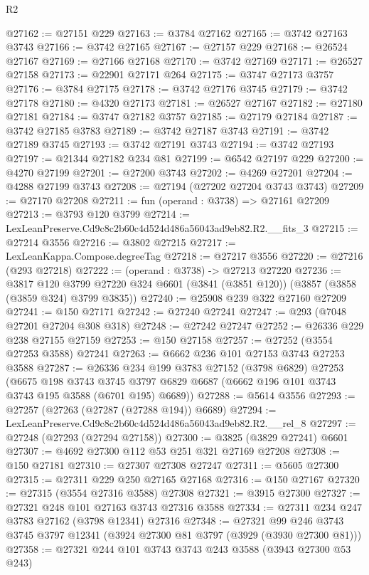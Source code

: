 \begin{lexlean}{R2}
\begin{coremodule}
@27162 := @27151 @229
@27163 := @3784 @27162
@27165 := @3742 @27163 @3743
@27166 := @3742 @27165
@27167 := @27157 @229
@27168 := @26524 @27167
@27169 := @27166 @27168
@27170 := @3742 @27169
@27171 := @26527 @27158
@27173 := @22901 @27171 @264
@27175 := @3747 @27173 @3757
@27176 := @3784 @27175
@27178 := @3742 @27176 @3745
@27179 := @3742 @27178
@27180 := @4320 @27173
@27181 := @26527 @27167
@27182 := @27180 @27181
@27184 := @3747 @27182 @3757
@27185 := @27179 @27184
@27187 := @3742 @27185 @3783
@27189 := @3742 @27187 @3743
@27191 := @3742 @27189 @3745
@27193 := @3742 @27191 @3743
@27194 := @3742 @27193
@27197 := @21344 @27182 @234 @81
@27199 := @6542 @27197 @229
@27200 := @4270 @27199
@27201 := @27200 @3743
@27202 := @4269 @27201
@27204 := @4288 @27199 @3743
@27208 := @27194 (@27202 @27204 @3743 @3743)
@27209 := @27170 @27208
@27211 := fun (operand : @3738) => @27161 @27209
@27213 := @3793 @120 @3799
@27214 := LexLeanPreserve.Cd9c8c2b60c4d524d486a56043ad9eb82.R2.__fits_3
@27215 := @27214 @3556
@27216 := @3802 @27215
@27217 := LexLeanKappa.Compose.degreeTag
@27218 := @27217 @3556
@27220 := @27216 (@293 @27218)
@27222 := (operand : @3738) -> @27213 @27220
@27236 := @3817
    @120
    @3799
    @27220
    @324
    @6601
    (@3841 (@3851 @120))
    (@3857 (@3858 (@3859 @324) @3799 @3835))
@27240 := @25908 @239 @322 @27160 @27209
@27241 := @150 @27171
@27242 := @27240 @27241
@27247 := @293 (@7048 @27201 @27204 @308 @318)
@27248 := @27242 @27247
@27252 := @26336 @229 @238 @27155 @27159
@27253 := @150 @27158
@27257 := @27252 (@3554 @27253 @3588) @27241
@27263 := @6662 @236 @101 @27153 @3743 @27253 @3588
@27287 := @26336
    @234
    @199
    @3783
    @27152
    (@3798 @6829)
    @27253
    (@6675
      @198
      @3743
      @3745
      @3797
      @6829
      @6687
      (@6662 @196 @101 @3743 @3743 @195 @3588 (@6701 @195) @6689))
@27288 := @5614 @3556
@27293 := @27257 (@27263 (@27287 (@27288 @194)) @6689)
@27294 := LexLeanPreserve.Cd9c8c2b60c4d524d486a56043ad9eb82.R2.__rel_8
@27297 := @27248 (@27293 (@27294 @27158))
@27300 := @3825 (@3829 @27241) @6601
@27307 := @4692 @27300 @112 @53 @251 @321 @27169 @27208
@27308 := @150 @27181
@27310 := @27307 @27308 @27247
@27311 := @5605 @27300
@27315 := @27311 @229 @250 @27165 @27168
@27316 := @150 @27167
@27320 := @27315 (@3554 @27316 @3588) @27308
@27321 := @3915 @27300
@27327 := @27321 @248 @101 @27163 @3743 @27316 @3588
@27334 := @27311 @234 @247 @3783 @27162 (@3798 @12341) @27316
@27348 := @27321
    @99
    @246
    @3743
    @3745
    @3797
    @12341
    (@3924 @27300 @81 @3797 (@3929 (@3930 @27300 @81)))
@27358 := @27321 @244 @101 @3743 @3743 @243 @3588 (@3943 @27300 @53 @243)

\end{coremodule}
\end{lexlean}
